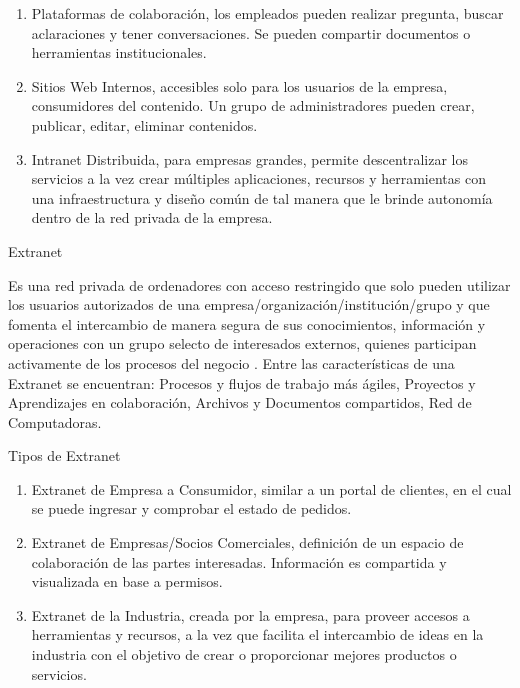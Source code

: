 \documentclass[a4paper,12pt]{article}
\begin{document}
\begin{enumerate} 
\item Plataformas de colaboración, los empleados pueden realizar pregunta, buscar 
aclaraciones y tener conversaciones. Se pueden compartir documentos o herramientas 
institucionales.\\
\item Sitios Web Internos, accesibles solo para los usuarios de la empresa, consumidores
del contenido. Un grupo de administradores pueden crear, publicar, editar, 
eliminar contenidos.\\ 
\item Intranet Distribuida, para empresas grandes, permite descentralizar los servicios 
a la vez crear múltiples aplicaciones, recursos y herramientas con una 
infraestructura y diseño común de tal manera que le brinde autonomía dentro de la 
red privada de la empresa.\\
\end{enumerate}
\begin{bf}
Extranet\\
\end{bf}
Es una red privada de ordenadores con acceso restringido que solo pueden utilizar 
los usuarios autorizados de una empresa/organización/institución/grupo y que 
fomenta el intercambio de manera segura de sus conocimientos, información y 
operaciones con un grupo selecto de interesados externos, quienes participan 
activamente de los procesos del negocio \cite{Cabello2014}. 
Entre las características de una Extranet se encuentran: Procesos y flujos de 
trabajo más ágiles, Proyectos y Aprendizajes en colaboración, Archivos y Documentos 
compartidos, Red de Computadoras.\\ 
\newline
\begin{bf}  
Tipos de Extranet\\
\end{bf}
\begin{enumerate}    
\item Extranet de Empresa a Consumidor, similar a un portal de clientes, en el cual se 
puede ingresar y comprobar el estado de pedidos. 
\item Extranet de Empresas/Socios Comerciales, definición de un espacio de colaboración 
de las partes interesadas. Información es compartida y visualizada en base a 
permisos.
\item Extranet de la Industria, creada por la empresa, para proveer accesos a herramientas 
y recursos, a la vez que facilita el intercambio de ideas en la industria con el objetivo de crear o proporcionar mejores productos o servicios.\\ 
\end{enumerate}


\end{document}
